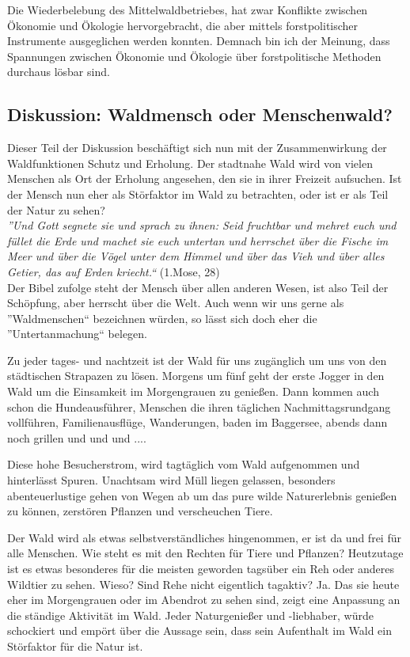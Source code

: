 \documentclass[12pt]{article}
\begin{document}
Die Wiederbelebung des Mittelwaldbetriebes, hat zwar Konflikte
zwischen Ökonomie und Ökologie hervorgebracht, die aber mittels forstpolitischer Instrumente ausgeglichen
werden konnten. Demnach bin ich der Meinung, dass Spannungen zwischen Ökonomie und Ökologie über forstpolitische 
Methoden durchaus lösbar sind. 


\subsection*{Diskussion: Waldmensch oder Menschenwald?}
Dieser Teil der Diskussion beschäftigt sich nun mit der Zusammenwirkung der Waldfunktionen
Schutz und Erholung. Der stadtnahe Wald wird von vielen Menschen als Ort der Erholung angesehen,
den sie in ihrer Freizeit aufsuchen. Ist der Mensch nun eher als Störfaktor im Wald zu betrachten,
oder ist er als Teil der Natur zu sehen? \\

\noindent \textit{''Und Gott segnete sie und sprach zu ihnen: Seid fruchtbar und mehret euch und füllet die Erde und 
machet sie euch untertan und herrschet über die Fische im Meer und über die Vögel unter dem 
Himmel und über das Vieh und über alles Getier, das auf Erden kriecht.``} (1.Mose, 28) \\

\noindent Der Bibel zufolge steht der Mensch über allen anderen Wesen, ist also Teil der Schöpfung, aber
herrscht über die Welt. Auch wenn wir uns gerne als ''Waldmenschen`` bezeichnen würden, so lässt sich doch
eher die ''Untertanmachung`` belegen. 

Zu jeder tages- und nachtzeit ist der Wald für uns zugänglich um uns von den städtischen Strapazen zu
lösen. Morgens um fünf geht der erste Jogger in den Wald um die Einsamkeit im Morgengrauen zu genießen.
Dann kommen auch schon die Hundeausführer, Menschen die ihren täglichen
Nachmittagsrundgang vollführen, Familienausflüge, Wanderungen, baden im Baggersee, abends dann noch grillen
und und und .... 

Diese hohe Besucherstrom, wird tagtäglich vom Wald aufgenommen und hinterlässt Spuren. Unachtsam wird
Müll liegen gelassen, besonders abenteuerlustige gehen von Wegen ab um das pure wilde Naturerlebnis genießen
zu können, zerstören Pflanzen und verscheuchen Tiere.

Der Wald wird als etwas selbstverständliches hingenommen, er ist da und frei für alle Menschen. 
Wie steht es mit den Rechten für Tiere und Pflanzen? Heutzutage ist es etwas besonderes für
die meisten geworden tagsüber ein Reh oder anderes Wildtier zu sehen. Wieso? Sind Rehe nicht eigentlich
tagaktiv? Ja. Das sie heute eher im Morgengrauen oder im Abendrot zu sehen sind, zeigt eine Anpassung
an die ständige Aktivität im Wald. 
Jeder Naturgenießer und -liebhaber, würde schockiert und empört über die Aussage sein, dass sein Aufenthalt im
Wald ein Störfaktor für die Natur ist.
\end{document}
